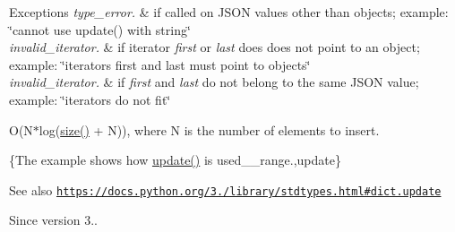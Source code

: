 \begin{DoxyExceptions}{Exceptions}
{\em type\+\_\+error.} & if called on J\+S\+ON values other than objects; example\+: {\ttfamily \char`\"{}cannot use update() with string\char`\"{}} \\
\hline
{\em invalid\+\_\+iterator.} & if iterator {\itshape first} or {\itshape last} does does not point to an object; example\+: {\ttfamily \char`\"{}iterators first and last must point to
objects\char`\"{}} \\
\hline
{\em invalid\+\_\+iterator.} & if {\itshape first} and {\itshape last} do not belong to the same J\+S\+ON value; example\+: {\ttfamily \char`\"{}iterators do not fit\char`\"{}}\\
\hline
\end{DoxyExceptions}
O(N$\ast$log(\hyperlink{classnlohmann_1_1basic__json_a33c7c8638bb0b12e6d1b69d8106dd2e0}{size()} + N)), where N is the number of elements to insert.

\{The example shows how {\ttfamily \hyperlink{classnlohmann_1_1basic__json_a377819905d567f6f523dcbc592cb6356}{update()}} is used\+\_\+\+\_\+range.,update\}

\begin{DoxySeeAlso}{See also}
\href{https://docs.python.org/3.6/library/stdtypes.html#dict.update}{\tt https\+://docs.\+python.\+org/3./library/stdtypes.\+html\#dict.\+update}
\end{DoxySeeAlso}
\begin{DoxySince}{Since}
version 3.. 
\end{DoxySince}
